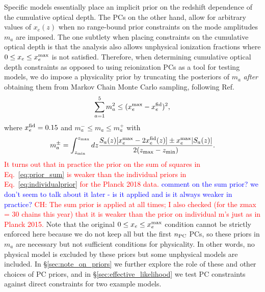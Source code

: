 \documentclass[prd,twocolumn,amsmath,amssymb,floatfix,superscriptaddress,nofootinbib]{revtex4-1}
\newcommand{\wh}[1]{\textcolor{blue}{#1}}
\newcommand{\ch}[1]{\textcolor{red}{#1}}
\begin{document}
Specific models essentially place an implicit prior on the redshift dependence of the cumulative optical depth.  
The PCs on the other hand, allow for arbitrary values of $x_e(z)$ when no range-bound prior constraints on the mode amplitudes $m_a$ are imposed. The one subtlety when placing constraints on the cumulative optical depth is that the analysis also allows
unphysical ionization fractions where $0 \le x_e \le x_e^{\rm max}$  is not satisfied.
Therefore, when determining cumulative optical depth constraints as opposed to using reionization PCs as a tool for testing models,
 we do impose a physicality prior
 by truncating the posteriors of $m_a$
 {\it after} obtaining them from Markov Chain Monte Carlo sampling, following Ref.~\cite{Mortonson:2008rx}
%
\begin{equation}
\sum_{a=1}^5 m_a^2 \le (x_e^{\rm max}-x_e^{\rm fid})^2,
\label{eq:prior_sum}
\end{equation}
where $x_e^{\rm fid}=0.15$ and $m_a^{-} \le m_a \le m_a^{+}$ with
\begin{equation}
m_a^{\pm} = \int_{z_{\rm min}}^{z_{\rm max} } dz \frac{S_a(z)[x_e^{\rm max} -2 x_e^{\rm fid}(z)]
\pm x_e^{\rm max} | S_a(z)|}{2(z_{\rm max}-z_{\rm min})}.
\label{eq:individualprior}
\end{equation}
\ch{It turns out that in practice the prior on the sum of squares in Eq.~\ref{eq:prior_sum} is weaker than the individual priors in Eq.~\ref{eq:individualprior} for the Planck 2018 data.}
\wh{comment on the sum prior?  we don't seem to talk about it later - is it applied and is it always weaker in practice?}
\ch{CH: The sum prior is applied at all times; I also checked  (for the zmax = 30 chains this year) that it is weaker than the prior on individual m's just as in Planck 2015.}
%
Note that the original $0\le x_e \le x_e^{\rm max}$ condition cannot be strictly enforced here because we do not keep all but the first $n_{\rm PC}$ PCs, so these priors in $m_a$ are necessary but not sufficient conditions for physicality.  
In other words, no physical model is excluded by these priors but some unphysical models are included.  In \S \ref{sec:note_on_priors} we further explore the role of these and other choices of PC priors, and in \S\ref{sec:effective_likelihood} we test PC constraints against direct constraints for two example models.  
\end{document}
